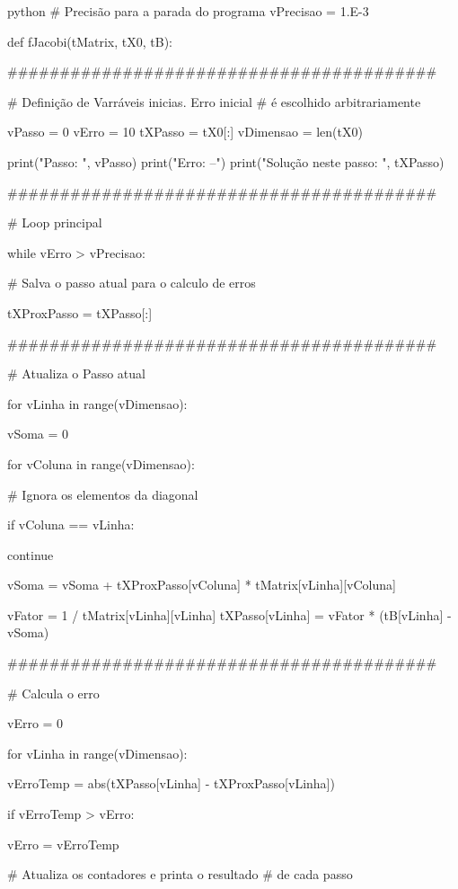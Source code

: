 \documentclass[twoside]{amsart}
\numberwithin{equation}{section}
\begin{document}
\begin{mintedbox}{python}
# Precisão para a parada do programa
vPrecisao = 1.E-3

def fJacobi(tMatrix, tX0, tB):
    
    #########################################

    # Definição de Varráveis inicias. Erro inicial
    # é escolhido arbitrariamente

    vPasso = 0
    vErro = 10
    tXPasso = tX0[:]
    vDimensao = len(tX0)

    print("Passo: ", vPasso)
    print("Erro: --")
    print("Solução neste passo: ", tXPasso)

    #########################################

    # Loop principal

    while vErro > vPrecisao:

    # Salva o passo atual para o calculo de erros

        tXProxPasso = tXPasso[:]

    #########################################

    # Atualiza o Passo atual

        for vLinha in range(vDimensao):

            vSoma = 0

            for vColuna in range(vDimensao):

    # Ignora os elementos da diagonal

                if vColuna == vLinha:

                    continue

                vSoma = vSoma + tXProxPasso[vColuna] * tMatrix[vLinha][vColuna]

            vFator = 1 / tMatrix[vLinha][vLinha]
            tXPasso[vLinha] = vFator * (tB[vLinha] - vSoma)

    #########################################

    # Calcula o erro 

        vErro = 0

        for vLinha in range(vDimensao):

            vErroTemp = abs(tXPasso[vLinha] - tXProxPasso[vLinha])

            if vErroTemp > vErro:

                vErro = vErroTemp

    # Atualiza os contadores e printa o resultado 
    # de cada passo


\end{mintedbox}
\end{document}
